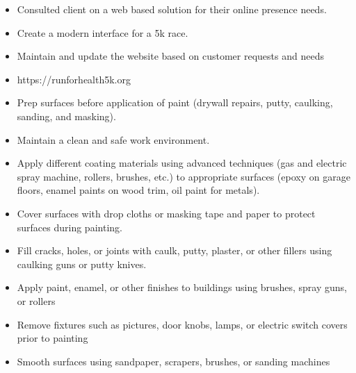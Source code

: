 \documentclass[10pt,a4paper,ragged2e,withhyper]{altacv}
\begin{document}

    \makecvheader



    \begin{paracol}{2}


      \begin{itemize}
          \item Consulted client on a web based solution for their online presence needs.
          \item Create a modern interface for a 5k race.
          \item Maintain and update the website based on customer requests and needs
          \item https://runforhealth5k.org
      \end{itemize}

      \begin{itemize}
        \item Prep surfaces before application of paint (drywall repairs, putty, caulking, sanding, and masking).
        \item Maintain a clean and safe work environment.
        \item Apply different coating materials using advanced techniques (gas and electric spray machine, rollers, brushes, etc.) to appropriate surfaces (epoxy on garage floors, enamel paints on wood trim, oil paint for metals).
      \end{itemize}

      \begin{itemize}
        \item Cover surfaces with drop cloths or masking tape and paper to protect surfaces during painting.
        \item Fill cracks, holes, or joints with caulk, putty, plaster, or other fillers using caulking guns or putty knives.
        \item  Apply paint, enamel, or other finishes to buildings using brushes, spray guns, or rollers
        \item Remove fixtures such as pictures, door knobs, lamps, or electric switch covers prior to painting
        \item Smooth surfaces using sandpaper, scrapers, brushes, or sanding machines
      \end{itemize}
      

\end{paracol}
\end{document}
